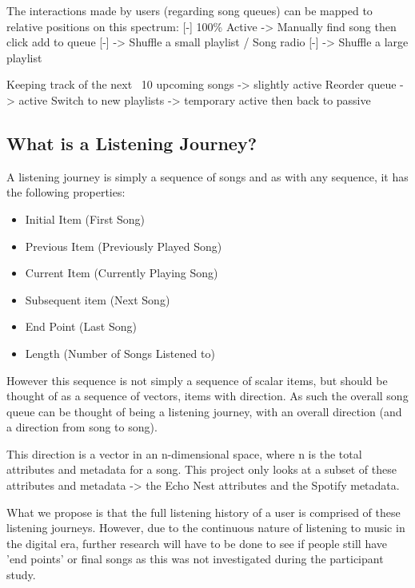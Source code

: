 The interactions made by users (regarding song queues) can be mapped to relative positions on this spectrum:
[-] 100\% Active -> Manually find song then click add to queue
[-] -> Shuffle a small playlist / Song radio
[-] -> Shuffle a large playlist

Keeping track of the next ~10 upcoming songs -> slightly active
Reorder queue -> active
Switch to new playlists -> temporary active then back to passive

\subsection{What is a Listening Journey?}
A listening journey is simply a sequence of songs and as with any sequence, it has the following properties:\begin{itemize}
    \item Initial Item (First Song)
    \item Previous Item (Previously Played Song)
    \item Current Item (Currently Playing Song)
    \item Subsequent item (Next Song)
    \item End Point (Last Song)
    \item Length (Number of Songs Listened to)
\end{itemize}

However this sequence is not simply a sequence of scalar items, but should be thought of as a sequence of vectors, items with direction. As such the overall song queue can be thought of being a listening journey, with an overall direction (and a direction from song to song).

This direction is a vector in an n-dimensional space, where n is the total attributes and metadata for a song. This project only looks at a subset of these attributes and metadata -> the Echo Nest attributes and the Spotify metadata.

What we propose is that the full listening history of a user is comprised of these listening journeys.
However, due to the continuous nature of listening to music in the digital era, further research will have to be done to see if people still have 'end points' or final songs as this was not investigated during the participant study.

